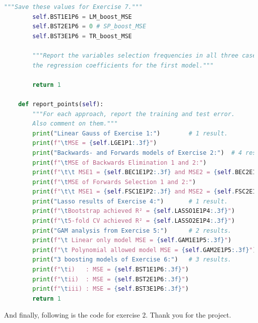 \documentclass[]{article}
\begin{document}
\begin{lstlisting}[language=Python]
		"""Save these values for Exercise 7."""
		self.BST1E1P6 = LM_boost_MSE
		self.BST2E1P6 = 0 # SP_boost_MSE
		self.BST3E1P6 = TR_boost_MSE
		
		"""Report the variables selection frequencies in all three cases and
		the regression coefficients for the first model."""
		
		return 1
	
	def report_points(self):
		"""For each approach, report the training and test error.
		Also comment on them."""
		print("Linear Gauss of Exercise 1:")        # 1 result.
		print(f"\tMSE = {self.LGE1P1:.3f}")
		print("Backwards- and Forwards models of Exercise 2:")  # 4 results.
		print(f"\tMSE of Backwards Elimination 1 and 2:")
		print(f"\t\t MSE1 = {self.BEC1E1P2:.3f} and MSE2 = {self.BEC2E1P2:.3f}")
		print(f"\tMSE of Forwards Selection 1 and 2:")
		print(f"\t\t MSE1 = {self.FSC1E1P2:.3f} and MSE2 = {self.FSC2E1P2:.3f}")
		print("Lasso results of Exercise 4:")       # 1 result.
		print(f"\tBootstrap achieved R² = {self.LASSO1E1P4:.3f}")
		print(f"\t5-fold CV achieved R² = {self.LASSO2E1P4:.3f}")
		print("GAM analysis from Exercise 5:")      # 2 results.
		print(f"\t Linear only model MSE = {self.GAM1E1P5:.3f}")
		print(f"\t Polynomial allowed model MSE = {self.GAM2E1P5:.3f}")
		print("3 boosting models of Exercise 6:")   # 3 results.
		print(f"\ti)   : MSE = {self.BST1E1P6:.3f}")
		print(f"\tii)  : MSE = {self.BST2E1P6:.3f}")
		print(f"\tiii) : MSE = {self.BST3E1P6:.3f}")
		return 1
\end{lstlisting}
And finally, following is the code for exercise 2. Thank you for the project.
\end{document}
